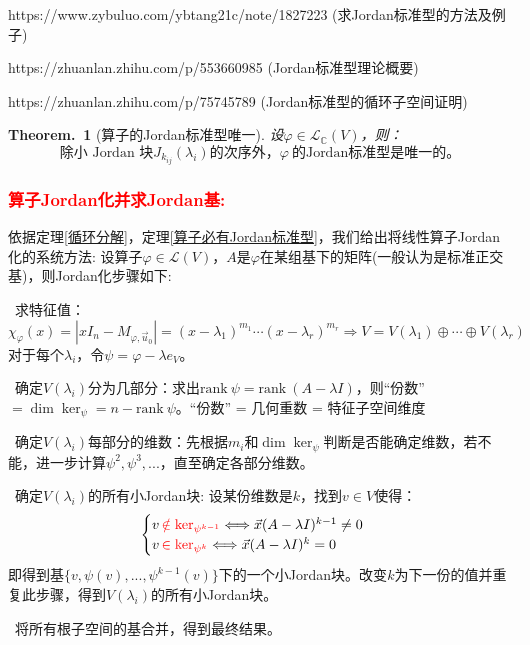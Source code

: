 \documentclass[zihao=-4,UTF8]{report}
\theoremstyle{mystyle} %
\newtheorem{theorem}{Theorem.\,}
\begin{document}
https://www.zybuluo.com/ybtang21c/note/1827223 (求Jordan标准型的方法及例子) \par
https://zhuanlan.zhihu.com/p/553660985 (Jordan标准型理论概要)\par
https://zhuanlan.zhihu.com/p/75745789 (Jordan标准型的循环子空间证明)
\begin{theorem}[算子的Jordan标准型唯一]
设$\varphi \in \mathscr{L}_{\mathbb{C}}(V)$，则：
\begin{equation*}
    \text{除小 Jordan 块$J_{k_{ij}}(\lambda_i)$的次序外，}\varphi\  \text{的Jordan标准型是唯一的。}
\end{equation*}
\end{theorem}
\subsubsection{\textcolor{red}{算子Jordan化并求Jordan基: }}
依据定理\ref{循环分解}，定理\ref{算子必有Jordan标准型}，我们给出将线性算子Jordan化的系统方法: 
设算子$\varphi \in \mathscr{L}(V)$，$A$是$\varphi$在某组基下的矩阵(一般认为是标准正交基)，则Jordan化步骤如下: \par
{}\ 求特征值：$\chi_{\varphi}(x) = \left | xI_n - M_{\varphi,\vec{u}_0}\right | =(x-\lambda_1)^{m_1} \cdots (x-\lambda_r)^{m_r} \Longrightarrow V = V(\lambda_1) \oplus \cdots \oplus V(\lambda_r)$\\
对于每个$\lambda_i$，令$\psi = \varphi -\lambda e_V$。 \par
{}\ 确定$V(\lambda_i)$分为几部分：求出$\text{rank}\ \psi = \text{rank}\ (A -\lambda I) $，则“份数”$ = \dim \ker_{\psi} = n - \text{rank}\ \psi$。{\color{gray}\small “份数” = 几何重数 = 特征子空间维度}
\par
{}\ 确定$V(\lambda_i)$每部分的维数：先根据$m_i$和$\dim \ker_{\psi}$判断是否能确定维数，若不能，进一步计算$\psi^2,\psi^3,...$，直至确定各部分维数。\par
{}\ 确定$V(\lambda_i)$的所有小Jordan块: 设某份维数是$k$，找到$v \in V$使得：
\begin{equation*}
    \begin{cases}
        v\, \textcolor{red}{\notin\ker_{\psi^{k-1}}} \Longleftrightarrow \vec{x}(A - \lambda I)^{k-1} \ne 0 \\
        v\,  \textcolor{red}{\in \ker_{\psi^{k}} }\Longleftrightarrow\vec{x}(A - \lambda I)^{k} = 0 
    \end{cases}
\end{equation*}
即得到基$\{v, \psi(v),..., \psi^{k-1}(v)\}$下的一个小Jordan块。改变$k$为下一份的值并重复此步骤，得到$V(\lambda_i)$的所有小Jordan块。
\par
{}\ 将所有根子空间的基合并，得到最终结果。\par
\end{document}
